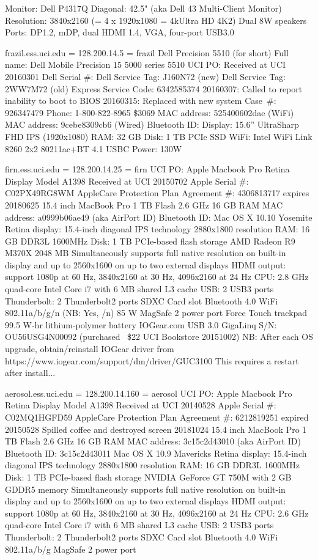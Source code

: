 \documentclass[12pt,twoside]{article}
\begin{document}
Monitor: Dell P4317Q
Diagonal: 42.5" (aka Dell 43 Multi-Client Monitor)
Resolution: 3840x2160 (= 4 x 1920x1080 = 4kUltra HD 4K2)
Dual 8W speakers
Ports: DP1.2, mDP, dual HDMI 1.4, VGA, four-port USB3.0

frazil.ess.uci.edu = 128.200.14.5 = frazil
Dell Precision 5510 (for short)
Full name: Dell Mobile Precision 15 5000 series 5510
UCI PO: 
Received at UCI 20160301
Dell Serial \#: 
Dell Service Tag: J160N72 (new)
Dell Service Tag: 2WW7M72 (old)
Express Service Code: 6342585374
20160307: Called to report inability to boot to BIOS
20160315: Replaced with new system
Case~\#: 926347479
Phone: 1-800-822-8965
\$3069
MAC address: 525400602dae (WiFi)
MAC address: 9cebe8309cb6 (Wired)
Bluetooth ID: 
Display: 15.6'' UltraSharp FHD IPS (1920x1080) 
RAM: 32 GB 
Disk: 1 TB PCIe SSD
WiFi: Intel WiFi Link 8260 2x2 80211ac+BT 4.1
USBC
Power: 130W

firn.ess.uci.edu = 128.200.14.25 = firn
UCI PO: 
Apple Macbook Pro Retina Display
Model A1398
Received at UCI 20150702
Apple Serial \#: C02PX49RG8WM
AppleCare Protection Plan Agreement \#: 4306813717 expires 20180625
15.4 inch MacBook Pro
1 TB Flash
2.6 GHz
16 GB RAM
MAC address: a0999b06ae49 (aka AirPort ID)
Bluetooth ID: 
Mac OS X 10.10 Yosemite
Retina display: 15.4-inch diagonal
IPS technology 2880x1800 resolution
RAM: 16 GB DDR3L 1600MHz
Disk: 1 TB PCIe-based flash storage
AMD Radeon R9 M370X 2048 MB
Simultaneously supports full native resolution on built-in display and up to 2560x1600 on up to two external displays
HDMI output: support 1080p at 60 Hz, 3840x2160 at 30 Hz, 4096x2160 at 24 Hz
CPU: 2.8 GHz quad-core Intel Core i7 with 6 MB shared L3 cache
USB: 2 USB3 ports
Thunderbolt: 2 Thunderbolt2 ports
SDXC Card slot
Bluetooth 4.0
WiFi 802.11a/b/g/n (NB: Yes, /n)
85 W MagSafe 2 power port
Force Touch trackpad
99.5 W-hr lithium-polymer battery
IOGear.com USB 3.0 GigaLinq S/N: OU56USG4N00092 (purchased ~\$22 UCI Bookstore 20151002)
NB: After each OS upgrade, obtain/reinstall IOGear driver from
https://www.iogear.com/support/dm/driver/GUC3100
This requires a restart after install...

aerosol.ess.uci.edu = 128.200.14.160 = aerosol
UCI PO: 
Apple Macbook Pro Retina Display
Model A1398
Received at UCI 20140528
Apple Serial \#: C02MQ1HGFD59
AppleCare Protection Plan Agreement \#: 6212819251 expired 20150528
Spilled coffee and destroyed screen 20181024
15.4 inch MacBook Pro
1 TB Flash
2.6 GHz
16 GB RAM
MAC address: 3c15c2d43010 (aka AirPort ID)
Bluetooth ID: 3c15c2d43011
Mac OS X 10.9 Mavericks
Retina display: 15.4-inch diagonal
IPS technology 2880x1800 resolution
RAM: 16 GB DDR3L 1600MHz
Disk: 1 TB PCIe-based flash storage
NVIDIA GeForce GT 750M with 2 GB GDDR5 memory
Simultaneously supports full native resolution on built-in display and up to 2560x1600 on up to two external displays
HDMI output: support 1080p at 60 Hz, 3840x2160 at 30 Hz, 4096x2160 at 24 Hz
CPU: 2.6 GHz quad-core Intel Core i7 with 6 MB shared L3 cache
USB: 2 USB3 ports
Thunderbolt: 2 Thunderbolt2 ports
SDXC Card slot
Bluetooth 4.0
WiFi 802.11a/b/g 
MagSafe 2 power port
\end{document}
